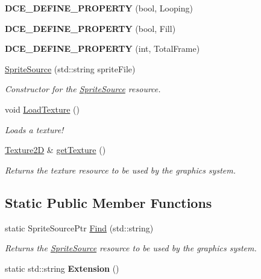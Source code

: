 \begin{DoxyCompactItemize}
\item 
\hypertarget{classDCEngine_1_1SpriteSource_ac9a9ac00a2299212971eba49c45fc2bf}{{\bfseries D\-C\-E\-\_\-\-D\-E\-F\-I\-N\-E\-\_\-\-P\-R\-O\-P\-E\-R\-T\-Y} (bool, Looping)}\label{classDCEngine_1_1SpriteSource_ac9a9ac00a2299212971eba49c45fc2bf}

\item 
\hypertarget{classDCEngine_1_1SpriteSource_a3a1ad1a532c86dd54d79bd5d393b1d8d}{{\bfseries D\-C\-E\-\_\-\-D\-E\-F\-I\-N\-E\-\_\-\-P\-R\-O\-P\-E\-R\-T\-Y} (bool, Fill)}\label{classDCEngine_1_1SpriteSource_a3a1ad1a532c86dd54d79bd5d393b1d8d}

\item 
\hypertarget{classDCEngine_1_1SpriteSource_a5ff9da591f1573b4bf47d6a796375b82}{{\bfseries D\-C\-E\-\_\-\-D\-E\-F\-I\-N\-E\-\_\-\-P\-R\-O\-P\-E\-R\-T\-Y} (int, Total\-Frame)}\label{classDCEngine_1_1SpriteSource_a5ff9da591f1573b4bf47d6a796375b82}

\item 
\hyperlink{classDCEngine_1_1SpriteSource_a13aa30e17ddeabc615d2ec809b888a73}{Sprite\-Source} (std\-::string sprite\-File)
\begin{DoxyCompactList}\small\item\em Constructor for the \hyperlink{classDCEngine_1_1SpriteSource}{Sprite\-Source} resource. \end{DoxyCompactList}\item 
void \hyperlink{classDCEngine_1_1SpriteSource_ab6e4b6ab4e014b9fe0b5c7e29a4297d1}{Load\-Texture} ()
\begin{DoxyCompactList}\small\item\em Loads a texture! \end{DoxyCompactList}\item 
\hyperlink{classDCEngine_1_1Texture2D}{Texture2\-D} \& \hyperlink{classDCEngine_1_1SpriteSource_a52673414085011158c336a619167b2d0}{get\-Texture} ()
\begin{DoxyCompactList}\small\item\em Returns the texture resource to be used by the graphics system. \end{DoxyCompactList}\end{DoxyCompactItemize}
\subsection*{Static Public Member Functions}
\begin{DoxyCompactItemize}
\item 
static Sprite\-Source\-Ptr \hyperlink{classDCEngine_1_1SpriteSource_a9d52ba10b3970bde5b979dc3c2727ecf}{Find} (std\-::string)
\begin{DoxyCompactList}\small\item\em Returns the \hyperlink{classDCEngine_1_1SpriteSource}{Sprite\-Source} resource to be used by the graphics system. \end{DoxyCompactList}\item 
\hypertarget{classDCEngine_1_1SpriteSource_a386ca87e9306a5b9eae9731a941e07b7}{static std\-::string {\bfseries Extension} ()}\label{classDCEngine_1_1SpriteSource_a386ca87e9306a5b9eae9731a941e07b7}

\end{DoxyCompactItemize}
